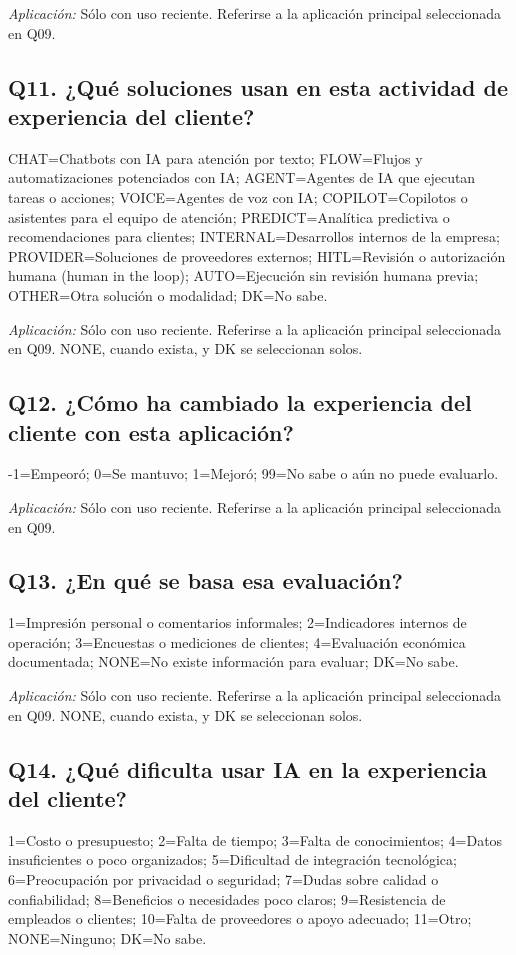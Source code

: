 \documentclass[12pt,letterpaper]{article}
\begin{document}
\emph{Aplicación:} Sólo con uso reciente. Referirse a la aplicación principal seleccionada en Q09.

\subsection*{Q11. ¿Qué soluciones usan en esta actividad de experiencia del cliente?}
CHAT=Chatbots con IA para atención por texto; FLOW=Flujos y automatizaciones potenciados con IA; AGENT=Agentes de IA que ejecutan tareas o acciones; VOICE=Agentes de voz con IA; COPILOT=Copilotos o asistentes para el equipo de atención; PREDICT=Analítica predictiva o recomendaciones para clientes; INTERNAL=Desarrollos internos de la empresa; PROVIDER=Soluciones de proveedores externos; HITL=Revisión o autorización humana (human in the loop); AUTO=Ejecución sin revisión humana previa; OTHER=Otra solución o modalidad; DK=No sabe.

\emph{Aplicación:} Sólo con uso reciente. Referirse a la aplicación principal seleccionada en Q09. NONE, cuando exista, y DK se seleccionan solos.

\subsection*{Q12. ¿Cómo ha cambiado la experiencia del cliente con esta aplicación?}
-1=Empeoró; 0=Se mantuvo; 1=Mejoró; 99=No sabe o aún no puede evaluarlo.

\emph{Aplicación:} Sólo con uso reciente. Referirse a la aplicación principal seleccionada en Q09.

\subsection*{Q13. ¿En qué se basa esa evaluación?}
1=Impresión personal o comentarios informales; 2=Indicadores internos de operación; 3=Encuestas o mediciones de clientes; 4=Evaluación económica documentada; NONE=No existe información para evaluar; DK=No sabe.

\emph{Aplicación:} Sólo con uso reciente. Referirse a la aplicación principal seleccionada en Q09. NONE, cuando exista, y DK se seleccionan solos.

\subsection*{Q14. ¿Qué dificulta usar IA en la experiencia del cliente?}
1=Costo o presupuesto; 2=Falta de tiempo; 3=Falta de conocimientos; 4=Datos insuficientes o poco organizados; 5=Dificultad de integración tecnológica; 6=Preocupación por privacidad o seguridad; 7=Dudas sobre calidad o confiabilidad; 8=Beneficios o necesidades poco claros; 9=Resistencia de empleados o clientes; 10=Falta de proveedores o apoyo adecuado; 11=Otro; NONE=Ninguno; DK=No sabe.
\end{document}
